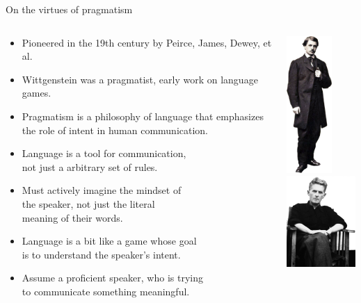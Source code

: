 \documentclass{beamer}
\begin{document}
\begin{frame}[fragile]{On the virtues of pragmatism}
  \begin{columns}[T]
    \begin{column}{0.9\textwidth}
      \begin{itemize}
        \item Pioneered in the 19th century by Peirce, James, Dewey, et al.
        \item Wittgenstein was a pragmatist, early work on language games.
        \item Pragmatism is a philosophy of language that emphasizes the role of intent in human communication.
        \item Language is a tool for communication, \\not just a arbitrary set of rules.
        \item Must actively imagine the mindset of\\ the speaker, not just the literal\\meaning of their words.
        \item Language is a bit like a game whose goal \\is to understand the speaker's intent.
        \item Assume a proficient speaker, who is trying \\to communicate something meaningful.
      \end{itemize}
    \end{column}
    \begin{column}{0.6\textwidth}
      \vspace*{2cm}
      \hspace*{-3cm}
      \includegraphics[width=1.7cm]{../figures/photo_pierce.png}
      \includegraphics[width=2.6cm]{../figures/photo_wittgenstein.png}
    \end{column}
  \end{columns}
\end{frame}
\end{document}
